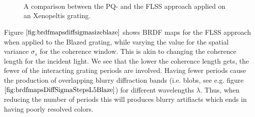 \begin{figure}[H]
  \centering
~

~
  
~
  
\caption[BRDF Map: PQ vs FLSS Approach on Xenopeltis Grating]{A comparison between the PQ- and the FLSS approach applied on an Xenopeltis grating.}
\label{fig:pqxeno}
\end{figure}

Figure $\ref{fig:brdfmapsdiffsigmasizeblaze}$ shows BRDF maps for the FLSS approach when applied to the Blazed grating, while varying the value for the spatial variance $\sigma_s$ for the coherence window. This is akin to changing the coherence length for the incident light. We see that the lower the coherence length gets, the fewer of the interacting grating periods are involved. Having fewer periods cause the production of overlapping blurry diffraction bands (i.e. blobs, see e.g. figure $\ref{fig:brdfmapsDiffSigmaStepsL5Blaze}$) for different wavelengths $\lambda$. Thus, when reducing the number of periods this will produces blurry artifiacts which ends in having poorly resolved colors.  

